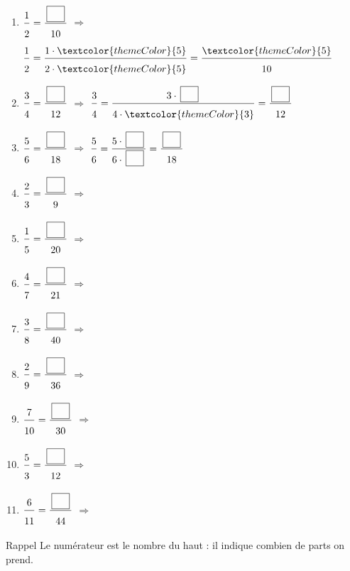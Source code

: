 \begin{enumerate}[leftmargin=*,align=parleft, label=\alph*), itemsep=9pt]
\item $\FA{1}{2}=\FA{\CaseC}{10}$ \quad $\Longrightarrow$ \quad $\FA{1}{2}=\FA{1 \cdot \textcolor{themeColor}{5}}{2 \cdot \textcolor{themeColor}{5}}=\FA{\textcolor{themeColor}{5}}{10}$
\item $\FA{3}{4}=\FA{\CaseC}{12}$ \quad $\Longrightarrow$ \quad $\FA{3}{4}=\FA{3 \cdot \CaseC}{4 \cdot \textcolor{themeColor}{3}}=\FA{\CaseC}{12}$
\item $\FA{5}{6}=\FA{\CaseC}{18}$ \quad $\Longrightarrow$ \quad $\FA{5}{6}=\FA{5 \cdot \CaseC}{6 \cdot \CaseC}=\FA{\CaseC}{18}$
\item $\FA{2}{3}=\FA{\CaseC}{9}$ \quad $\Longrightarrow$
\item $\FA{1}{5}=\FA{\CaseC}{20}$ \quad $\Longrightarrow$
\item $\FA{4}{7}=\FA{\CaseC}{21}$ \quad $\Longrightarrow$
\item $\FA{3}{8}=\FA{\CaseC}{40}$ \quad $\Longrightarrow$
\item $\FA{2}{9}=\FA{\CaseC}{36}$ \quad $\Longrightarrow$
\item $\FA{7}{10}=\FA{\CaseC}{30}$ \quad $\Longrightarrow$
\item $\FA{5}{3}=\FA{\CaseC}{12}$ \quad $\Longrightarrow$
\item $\FA{6}{11}=\FA{\CaseC}{44}$ \quad $\Longrightarrow$
\end{enumerate}

\newpage
{}

\begin{astuce}{Rappel}
Le \textcolor{themeColor}{numérateur} est le nombre du haut : il indique combien de parts on prend.
\end{astuce}

